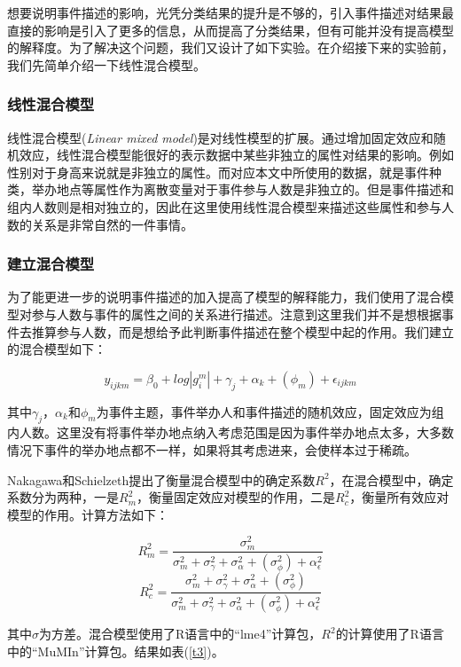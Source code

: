 想要说明事件描述的影响，光凭分类结果的提升是不够的，引入事件描述对结果最直接的影响是引入了更多的信息，从而提高了分类结果，但有可能并没有提高模型的解释度。为了解决这个问题，我们又设计了如下实验。在介绍接下来的实验前，我们先简单介绍一下线性混合模型。

\subsubsection{线性混合模型}

线性混合模型(\textit{Linear mixed model})是对线性模型的扩展。通过增加固定效应和随机效应，线性混合模型能很好的表示数据中某些非独立的属性对结果的影响。例如性别对于身高来说就是非独立的属性。而对应本文中所使用的数据，就是事件种类，举办地点等属性作为离散变量对于事件参与人数是非独立的。但是事件描述和组内人数则是相对独立的，因此在这里使用线性混合模型来描述这些属性和参与人数的关系是非常自然的一件事情。

\subsubsection{建立混合模型}

为了能更进一步的说明事件描述的加入提高了模型的解释能力，我们使用了混合模型对参与人数与事件的属性之间的关系进行描述。注意到这里我们并不是想根据事件去推算参与人数，而是想给予此判断事件描述在整个模型中起的作用。我们建立的混合模型如下：

\[
y_{ijkm}=\beta_0+log|g_i^m|+\gamma_j+\alpha_k+ (\phi_m) +\epsilon_{ijkm}
\]

其中\(\gamma_j\)，\(\alpha_k\)和\(\phi_m\)为事件主题，事件举办人和事件描述的随机效应，固定效应为组内人数。这里没有将事件举办地点纳入考虑范围是因为事件举办地点太多，大多数情况下事件的举办地点都不一样，如果将其考虑进来，会使样本过于稀疏。

Nakagawa和Schielzeth\cite{nakagawa_ageneralandsimplemethodforobtaining_2013}提出了衡量混合模型中的确定系数\(R^2\)，在混合模型中，确定系数分为两种，一是\(R_m^2\)，衡量固定效应对模型的作用，二是\(R_c^2\)，衡量所有效应对模型的作用。计算方法如下：

\[
R_m^2=\frac{\sigma_m^2}{\sigma_m^2+\sigma_\gamma^2+\sigma_\alpha^2+(\sigma_\phi^2)+\alpha_\epsilon^2}
\] \[
R_c^2=\frac{\sigma_m^2+\sigma_\gamma^2+\sigma_\alpha^2+(\sigma_\phi^2)}{\sigma_m^2+\sigma_\gamma^2+\sigma_\alpha^2+(\sigma_\phi^2)+\alpha_\epsilon^2}
\]

其中\(\sigma\)为方差。混合模型使用了R语言中的``lme4''计算包\cite{lme4}，\(R^2\)的计算使用了R语言
中的``MuMIn''计算包\cite{MuMIn}。结果如表(\ref{t3})。

